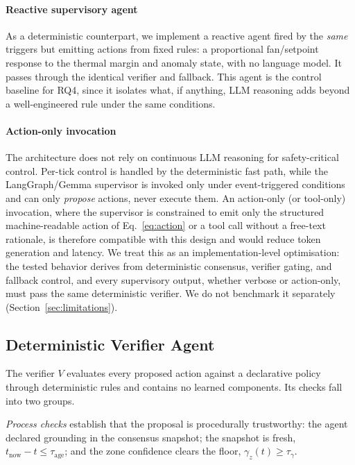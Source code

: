 \documentclass[smartcities,article,submit,moreauthors]{Definitions/mdpi}
\begin{document}
\paragraph{Reactive supervisory agent}
As a deterministic counterpart, we implement a reactive agent fired by the
\emph{same} triggers but emitting actions from fixed rules: a
proportional fan/setpoint response to the thermal margin and anomaly
state, with no language model. It passes through the identical verifier
and fallback. This agent is the control baseline for RQ4, since it
isolates what, if anything, LLM reasoning adds beyond a well-engineered
rule under the same conditions.

\paragraph{Action-only invocation}
The architecture does not rely on continuous LLM reasoning for
safety-critical control. Per-tick control is handled by the deterministic
fast path, while the LangGraph/Gemma supervisor is invoked only under
event-triggered conditions and can only \emph{propose} actions, never
execute them. An action-only (or tool-only) invocation, where the
supervisor is constrained to emit only the structured machine-readable
action of Eq.~\eqref{eq:action} or a tool call without a free-text
rationale, is therefore compatible with this design and would reduce
token generation and latency. We treat this as an implementation-level optimisation: the tested behavior
derives from deterministic consensus, verifier gating, and fallback control,
and every supervisory output, whether verbose or
action-only, must pass the same deterministic verifier. We do not
benchmark it separately (Section~\ref{sec:limitations}).

\subsection{Deterministic Verifier Agent}
\label{sec:verifier}

The verifier $V$ evaluates every proposed action against a declarative
policy through deterministic rules and contains no learned components.
Its checks fall into two groups.

\emph{Process checks} establish that the proposal is procedurally
trustworthy: the agent declared grounding in the consensus snapshot;
the snapshot is fresh, $t_{\mathrm{now}}-t \leq \tau_{\mathrm{age}}$;
and the zone confidence clears the floor,
$\gamma_z(t)\geq\tau_{\gamma}$.
\end{document}
